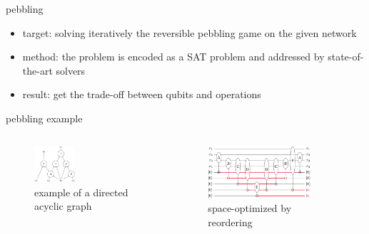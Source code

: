  \begin{frame}{pebbling}
    \begin{itemize}
      \item target: solving iteratively the reversible pebbling game on the given network
      \item method: the problem is encoded as a SAT problem and addressed by state-of-the-art solvers
      \item result: get the trade-off between qubits and operations
    \end{itemize}
  \end{frame}
  \begin{frame}{pebbling example}
    \begin{columns}
        \begin{minipage}[c][0.4\textheight][c]{\linewidth}
          \begin{figure}[h]
            \centering
            \includegraphics[width=0.4\textwidth]{figure/DAG.png}
            \caption{example of a directed acyclic graph}
          \end{figure}
        \end{minipage}
        \begin{minipage}[c][0.4\textheight][c]{\linewidth}
          \begin{figure}[h]
            \centering
            \includegraphics[width=0.8\textwidth]{figure/b.png}
            \caption{space-optimized by reordering}
          \end{figure}
        \end{minipage}
        

\end{columns}
\end{frame}
